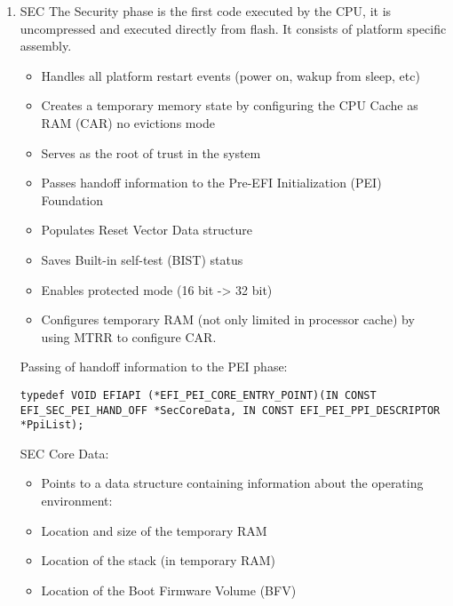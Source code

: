 \begin{enumerate}
    \item{\acf{SEC}}
    The Security phase is the first code executed by the CPU, it is uncompressed and executed directly from flash. It consists of platform specific assembly.

    \begin{itemize}
        \item  Handles all platform restart events (power on, wakup from sleep, etc)
        \item  Creates a temporary memory state by configuring the CPU Cache as RAM (CAR) no evictions mode
        \item  Serves as the root of trust in the system
        \item  Passes handoff information to the Pre-EFI Initialization (PEI) Foundation
    \end{itemize}



    \begin{itemize}
        \item Populates Reset Vector Data structure
        \item Saves Built-in self-test (BIST) status
        \item Enables protected mode (16 bit -> 32 bit)
        \item Configures temporary RAM (not only limited in processor cache) by using MTRR to configure CAR.
    \end{itemize}

    Passing of handoff information to the PEI phase:

    \lstinline{typedef VOID EFIAPI (*EFI_PEI_CORE_ENTRY_POINT)(IN CONST EFI_SEC_PEI_HAND_OFF *SecCoreData, IN CONST EFI_PEI_PPI_DESCRIPTOR *PpiList);}

    SEC Core Data:
    \begin{itemize}
        \item Points to a data structure containing information about the operating environment:
        \item Location and size of the temporary RAM
        \item Location of the stack (in temporary RAM)
        \item Location of the Boot Firmware Volume (BFV)
    \end{itemize}



\end{enumerate}
